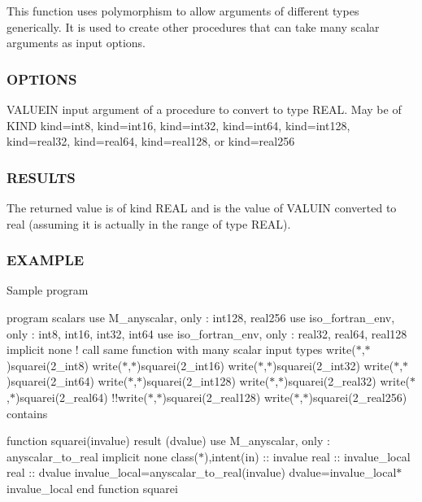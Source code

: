 \begin{DoxyVerb}This function uses polymorphism to allow arguments of different types
generically. It is used to create other procedures that can take
many scalar arguments as input options.
\end{DoxyVerb}


\subsubsection*{O\+P\+T\+I\+O\+NS}

\begin{DoxyVerb}VALUEIN  input argument of a procedure to convert to type REAL.
         May be of KIND kind=int8, kind=int16, kind=int32, kind=int64,
         kind=int128, kind=real32, kind=real64, kind=real128,
         or kind=real256
\end{DoxyVerb}
 \subsubsection*{R\+E\+S\+U\+L\+TS}

The returned value is of kind R\+E\+AL and is the value of V\+A\+L\+U\+IN converted to real (assuming it is actually in the range of type R\+E\+AL).

\subsubsection*{E\+X\+A\+M\+P\+LE}

Sample program

program scalars use M\+\_\+anyscalar, only \+: int128, real256 use iso\+\_\+fortran\+\_\+env, only \+: int8, int16, int32, int64 use iso\+\_\+fortran\+\_\+env, only \+: real32, real64, real128 implicit none ! call same function with many scalar input types write($\ast$,$\ast$)squarei(2\+\_\+int8) write($\ast$,$\ast$)squarei(2\+\_\+int16) write($\ast$,$\ast$)squarei(2\+\_\+int32) write($\ast$,$\ast$)squarei(2\+\_\+int64) write($\ast$,$\ast$)squarei(2\+\_\+int128) write($\ast$,$\ast$)squarei(2\+\_\+real32) write($\ast$,$\ast$)squarei(2\+\_\+real64) !!write($\ast$,$\ast$)squarei(2\+\_\+real128) write($\ast$,$\ast$)squarei(2\+\_\+real256) contains

function squarei(invalue) result (dvalue) use M\+\_\+anyscalar, only \+: anyscalar\+\_\+to\+\_\+real implicit none class($\ast$),intent(in) \+:\+: invalue real \+:\+: invalue\+\_\+local real \+:\+: dvalue invalue\+\_\+local=anyscalar\+\_\+to\+\_\+real(invalue) dvalue=invalue\+\_\+local$\ast$invalue\+\_\+local end function squarei

